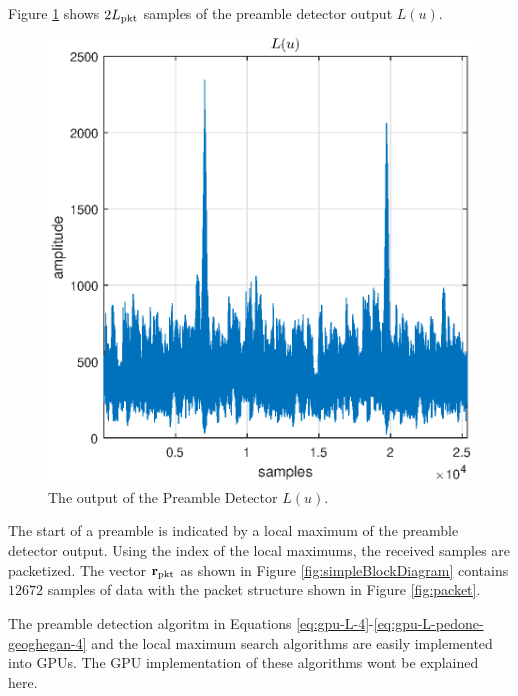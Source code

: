 Figure \ref{fig:L_2_packets} shows $2L_\text{pkt}$ samples of the preamble detector output $L(u)$.
\begin{figure}
	\centering\includegraphics[width=5in]{figures/gpu/L_2_packets.eps}
	\caption{The output of the Preamble Detector $L(u)$.}
	\label{fig:L_2_packets}
\end{figure}
The start of a preamble is indicated by a local maximum of the preamble detector output.
Using the index of the local maximums, the received samples are packetized.
The vector $\mathbf{r}_\text{pkt}$ as shown in Figure \ref{fig:simpleBlockDiagram} contains $12672$ samples of data with the packet structure shown in Figure \ref{fig:packet}.

The preamble detection algoritm in Equations \eqref{eq:gpu-L-4}-\eqref{eq:gpu-L-pedone-geoghegan-4} and the local maximum search algorithms are easily implemented into GPUs.
The GPU implementation of these algorithms wont be explained here.


